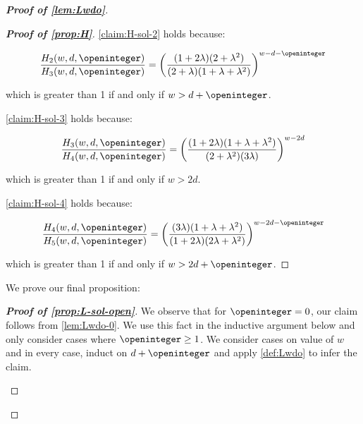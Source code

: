 \begin{proof}[\textbf{Proof of \cref{lem:Lwdo}}]
\begin{proof}[\textbf{Proof of \cref{prop:H}}]
\cref{claim:H-sol-2} holds because: 

\begin{equation*}
\frac{H_2(w, d, \openinteger)}{H_3(w, d, \openinteger)} = \left(\frac{(1+2\lambda)(2+\lambda^2)}{(2+\lambda)(1+\lambda+\lambda^2)}\right)^{w-d-\openinteger}
\end{equation*}

which is greater than 1 if and only if $w > d + \openinteger$.

\cref{claim:H-sol-3} holds because:

\begin{equation*}
\frac{H_3(w, d, \openinteger)}{H_4(w, d, \openinteger)} = \left(\frac{(1+2\lambda)(1+\lambda+\lambda^2)}{(2+\lambda^2)(3\lambda)}\right)^{w-2d}
\end{equation*}

which is greater than 1 if and only if $w>2d$.

\cref{claim:H-sol-4} holds because:

\begin{equation*}
\frac{H_4(w, d, \openinteger)}{H_5(w, d, \openinteger)} =\left(\frac{(3\lambda)(1+\lambda+\lambda^2)}{(1+2\lambda)(2\lambda+\lambda^2)}\right)^{w-2d-\openinteger}
\end{equation*}

which is greater than 1 if and only if $w>2d+\openinteger$.
\end{proof}

We prove our final proposition:

\begin{proof}[\textbf{Proof of \cref{prop:L-sol-open}}]
We observe that for $\openinteger = 0$, our claim follows from \cref{lem:Lwdo-0}.
We use this fact in the inductive argument below and only consider cases where $\openinteger \ge 1$. We consider cases on value of $w$ and in every case, induct on $d + \openinteger$ and apply \cref{def:Lwdo} to infer the claim.  

\begin{enumerate}[label=\textbf{Case \arabic*:}, itemindent=*, leftmargin=0em]


\end{enumerate}
\end{proof}
\end{proof}
